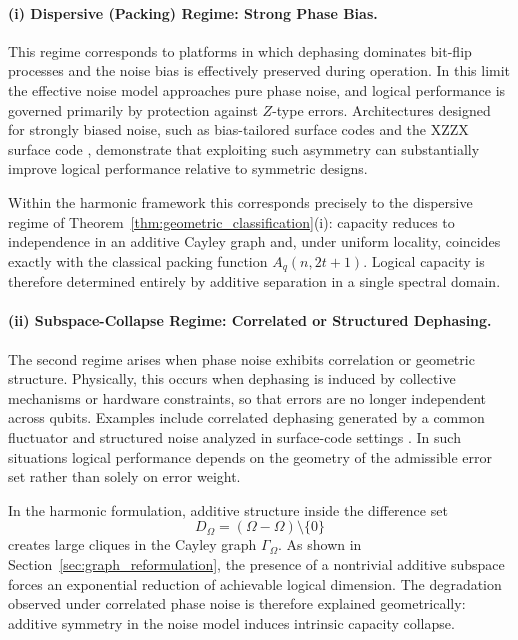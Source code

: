 \documentclass[a4paper,twocolumn,11pt,allowtoday]{quantumarticle}
\theoremstyle{plain}
\theoremstyle{definition}
\theoremstyle{remark}
\begin{document}
\paragraph{(i) Dispersive (Packing) Regime: Strong Phase Bias.}

This regime corresponds to platforms in which dephasing dominates bit-flip processes and the noise bias is effectively preserved during operation. In this limit the effective noise model approaches pure phase noise, and logical performance is governed primarily by protection against $Z$-type errors. Architectures designed for strongly biased noise, such as bias-tailored surface codes \cite{Tuckett2019} and the XZZX surface code \cite{BonillaAtaides2021}, demonstrate that exploiting such asymmetry can substantially improve logical performance relative to symmetric designs.

Within the harmonic framework this corresponds precisely to the dispersive regime of Theorem~\ref{thm:geometric_classification}(i): capacity reduces to independence in an additive Cayley graph and, under uniform locality, coincides exactly with the classical packing function $A_q(n,2t+1)$. Logical capacity is therefore determined entirely by additive separation in a single spectral domain.

\paragraph{(ii) Subspace-Collapse Regime: Correlated or Structured Dephasing.}

The second regime arises when phase noise exhibits correlation or geometric structure. Physically, this occurs when dephasing is induced by collective mechanisms or hardware constraints, so that errors are no longer independent across qubits. Examples include correlated dephasing generated by a common fluctuator \cite{Layden2020} and structured noise analyzed in surface-code settings \cite{NickersonBrown2019}. In such situations logical performance depends on the geometry of the admissible error set rather than solely on error weight.

In the harmonic formulation, additive structure inside the difference set
\[
D_\Omega = (\Omega-\Omega)\setminus\{0\}
\]
creates large cliques in the Cayley graph $\Gamma_\Omega$. As shown in Section~\ref{sec:graph_reformulation}, the presence of a nontrivial additive subspace forces an exponential reduction of achievable logical dimension. The degradation observed under correlated phase noise is therefore explained geometrically: additive symmetry in the noise model induces intrinsic capacity collapse.
\end{document}
